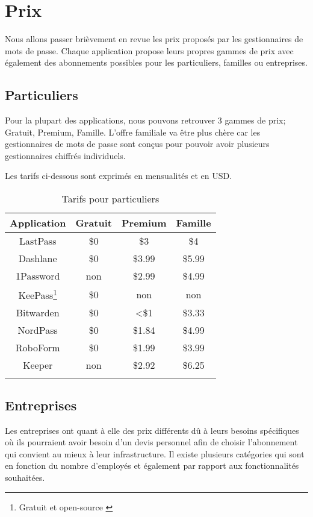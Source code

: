 \section{Prix}
Nous allons passer brièvement en revue les prix proposés par les gestionnaires de mots de passe. Chaque application propose leurs propres gammes de prix avec également des abonnements possibles pour les particuliers, familles ou entreprises. 
\subsection{Particuliers}
Pour la plupart des applications, nous pouvons retrouver 3 gammes de prix; Gratuit, Premium, Famille. L'offre familiale va être plus chère car les gestionnaires de mots de passe sont conçus pour pouvoir avoir plusieurs gestionnaires chiffrés individuels. 

Les tarifs ci-dessous sont exprimés en mensualités et en USD. \\
\begin{longtable}[h]{|c|c|c|c|}
		\hline
	Application & Gratuit & Premium & Famille \\
		\hline
	LastPass & \$0 & \$3 & \$4  \\
		\hline
	Dashlane & \$0 & \$3.99 & \$5.99 \\
		\hline
	1Password & non & \$2.99 & \$4.99  \\
		\hline
	KeePass\footnote{Gratuit et open-source \label{kp}} & \$0 & non & non   \\
		\hline
	Bitwarden & \$0 & <\$1 & \$3.33   \\
		\hline
	NordPass & \$0 & \$1.84 & \$4.99  \\
	\hline
	RoboForm & \$0 & \$1.99 & \$3.99    \\
	\hline
	Keeper & non & \$2.92 & \$6.25  \\
		\hline
			\caption{Tarifs pour particuliers}
\end{longtable}
\subsection{Entreprises}
Les entreprises ont quant à elle des prix différents dû à leurs besoins spécifiques où ils pourraient avoir besoin d'un devis personnel afin de choisir l'abonnement qui convient au mieux à leur infrastructure. Il existe plusieurs catégories qui sont en fonction du nombre d'employés et également par rapport aux fonctionnalités souhaitées. 

